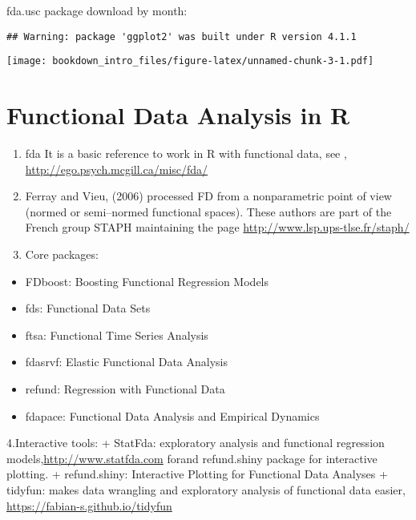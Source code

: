 \documentclass[
]{book}
\providecommand{\tightlist}{%
  \setlength{\itemsep}{0pt}\setlength{\parskip}{0pt}}
\begin{document}
fda.usc package download by month:

\begin{verbatim}
## Warning: package 'ggplot2' was built under R version 4.1.1
\end{verbatim}

\texttt{[image: bookdown\_intro\_files/figure-latex/unnamed-chunk-3-1.pdf]}

\hypertarget{functional-data-analysis-in-r}{%
\section*{Functional Data Analysis in R}\label{functional-data-analysis-in-r}}

\begin{enumerate}
\def\labelenumi{\arabic{enumi}.}
\item
  {fda} It is a basic reference to work in R with functional data, see \citep{Ramsay2005}, \url{http://ego.psych.mcgill.ca/misc/fda/}
\item
  Ferray and Vieu, (2006) processed FD from a nonparametric point of view (normed or semi--normed functional spaces).
  These authors are part of the French group STAPH maintaining the page
  \url{http://www.lsp.ups-tlse.fr/staph/}
\item
  {Core packages: }
\end{enumerate}

\begin{itemize}
\tightlist
\item
  {FDboost}: Boosting Functional Regression Models
\item
  {fds}: Functional Data Sets
\item
  {ftsa}: Functional Time Series Analysis
\item
  {fdasrvf}: Elastic Functional Data Analysis
\item
  {refund}: Regression with Functional Data
\item
  {fdapace}: Functional Data Analysis and Empirical Dynamics
\end{itemize}

4.{Interactive tools: }
+ {StatFda}: exploratory analysis and functional regression models,\url{http://www.statfda.com} forand refund.shiny package
for interactive plotting.
+ {refund.shiny}: Interactive Plotting for Functional Data Analyses
+ {tidyfun}: makes data wrangling and exploratory analysis of functional data easier, \url{https://fabian-s.github.io/tidyfun}
\end{document}
